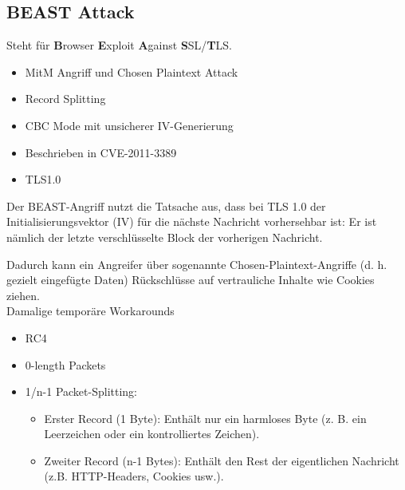 \subsection{BEAST Attack}

Steht für \textbf{B}rowser \textbf{E}xploit \textbf{A}gainst \textbf{S}SL/\textbf{T}LS.
\begin{itemize}
    \item MitM Angriff und Chosen Plaintext Attack
    \item Record Splitting
    \item CBC Mode mit unsicherer IV-Generierung
    \item Beschrieben in CVE-2011-3389
    \item TLS1.0
\end{itemize}

Der BEAST-Angriff nutzt die Tatsache aus, dass bei TLS 1.0 der
Initialisierungsvektor (IV) für die nächste Nachricht vorhersehbar ist:
Er ist nämlich der letzte verschlüsselte Block der vorherigen Nachricht.

Dadurch kann ein Angreifer über sogenannte Chosen-Plaintext-Angriffe (d. h. gezielt eingefügte Daten) Rückschlüsse auf vertrauliche
Inhalte wie Cookies ziehen. \\

\noindent Damalige temporäre Workarounds
\begin{itemize}
    \item RC4
    \item 0-length Packets
    \item 1/n-1 Packet-Splitting: 
    \begin{itemize}
        \item Erster Record (1 Byte): Enthält nur ein harmloses Byte (z. B. ein Leerzeichen oder ein kontrolliertes Zeichen).
        \item Zweiter Record (n-1 Bytes): Enthält den Rest der eigentlichen Nachricht (z.B. HTTP-Headers, Cookies usw.).
    \end{itemize}
\end{itemize}
 

